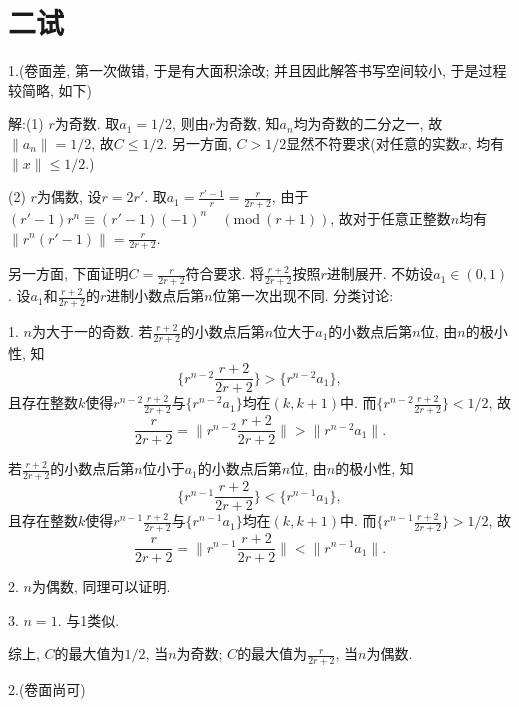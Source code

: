 \documentclass{article}
\begin{document}
\newpage

\section{二试}
1.({\kaishu 卷面差, 第一次做错, 于是有大面积涂改; 并且因此解答书写空间较小, 于是过程较简略, 如下})\par 
解:(1) $r$为奇数. 取$a_1=1/2$, 则由$r$为奇数, 知$a_n$均为奇数的二分之一, 故$\|a_n\|=1/2$, 故$C\le 1/2$. 另一方面, $C>1/2$显然不符要求(对任意的实数$x$, 均有$\|x\|\le 1/2$.)\par
(2) $r$为偶数, 设$r=2r'$. 取$a_1=\frac{r'-1}{r}=\frac{r}{2r+2}$, 由于$(r'-1)r^n\equiv (r'-1)(-1)^n\quad (\mathrm{mod}\ (r+1))$, 故对于任意正整数$n$均有$\|r^n(r'-1)\|=\frac{r}{2r+2}$. \par 
另一方面, 下面证明$C=\frac{r}{2r+2}$符合要求. 将$\frac{r+2}{2r+2}$按照$r$进制展开. 不妨设$a_1\in(0,1)$. 设$a_1$和$\frac{r+2}{2r+2}$的$r$进制小数点后第$n$位第一次出现不同. 分类讨论:\par 
1. $n$为大于一的奇数. 若$\frac{r+2}{2r+2}$的小数点后第$n$位大于$a_1$的小数点后第$n$位, 由$n$的极小性, 知
\[\{r^{n-2}\frac{r+2}{2r+2}\}>\{r^{n-2}a_1\},\]
且存在整数$k$使得$r^{n-2}\frac{r+2}{2r+2}$与$\{r^{n-2}a_1\}$均在$(k,k+1)$中. 而$\{r^{n-2}\frac{r+2}{2r+2}\}<1/2$, 故
\[\frac{r}{2r+2}=\|r^{n-2}\frac{r+2}{2r+2}\|>\|r^{n-2}a_1\|.\]\par 
若$\frac{r+2}{2r+2}$的小数点后第$n$位小于$a_1$的小数点后第$n$位, 由$n$的极小性, 知
\[\{r^{n-1}\frac{r+2}{2r+2}\}<\{r^{n-1}a_1\},\]
且存在整数$k$使得$r^{n-1}\frac{r+2}{2r+2}$与$\{r^{n-1}a_1\}$均在$(k,k+1)$中.
而$\{r^{n-1}\frac{r+2}{2r+2}\}>1/2$, 故
\[\frac{r}{2r+2}=\|r^{n-1}\frac{r+2}{2r+2}\|<\|r^{n-1}a_1\|.\]\par 
2. $n$为偶数, 同理可以证明.\par 
3. $n=1$. 与1类似.\par 
综上, $C$的最大值为$1/2$, 当$n$为奇数; $C$的最大值为$\frac{r}{2r+2}$, 当$n$为偶数.\\\par 
2.({\kaishu 卷面尚可})
\end{document}
